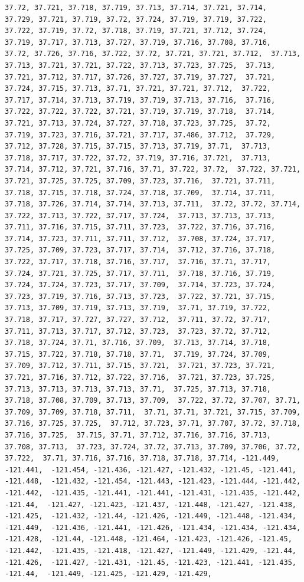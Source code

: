 \documentclass[
]{article}
\begin{document}
\begin{verbatim}
37.72, 37.721, 37.718, 37.719, 37.713, 37.714, 37.721, 37.714,  37.729, 37.721, 37.719, 37.72, 37.724, 37.719, 37.719, 37.722,  37.722, 37.719, 37.72, 37.718, 37.719, 37.721, 37.712, 37.724,  37.719, 37.717, 37.713, 37.727, 37.719, 37.716, 37.708, 37.716,  37.72, 37.726, 37.716, 37.722, 37.72, 37.721, 37.721, 37.712,  37.713, 37.713, 37.721, 37.721, 37.722, 37.713, 37.723, 37.725,  37.713, 37.721, 37.712, 37.717, 37.726, 37.727, 37.719, 37.727,  37.721, 37.724, 37.715, 37.713, 37.71, 37.721, 37.721, 37.712,  37.722, 37.717, 37.714, 37.713, 37.719, 37.719, 37.713, 37.716,  37.716, 37.722, 37.722, 37.722, 37.721, 37.719, 37.719, 37.718,  37.714, 37.721, 37.713, 37.724, 37.727, 37.718, 37.723, 37.725,  37.72, 37.719, 37.723, 37.716, 37.721, 37.717, 37.486, 37.712,  37.729, 37.712, 37.728, 37.715, 37.715, 37.713, 37.719, 37.71,  37.713, 37.718, 37.717, 37.722, 37.72, 37.719, 37.716, 37.721,  37.713, 37.714, 37.712, 37.721, 37.716, 37.71, 37.722, 37.72,  37.722, 37.721, 37.721, 37.725, 37.725, 37.709, 37.723, 37.716,  37.721, 37.711, 37.718, 37.715, 37.718, 37.724, 37.718, 37.709,  37.714, 37.711, 37.718, 37.726, 37.714, 37.714, 37.713, 37.711,  37.72, 37.72, 37.714, 37.722, 37.713, 37.722, 37.717, 37.724,  37.713, 37.713, 37.713, 37.711, 37.716, 37.715, 37.711, 37.723,  37.722, 37.716, 37.716, 37.714, 37.723, 37.711, 37.711, 37.712,  37.708, 37.724, 37.717, 37.725, 37.709, 37.723, 37.717, 37.714,  37.712, 37.716, 37.718, 37.722, 37.717, 37.718, 37.716, 37.717,  37.716, 37.71, 37.717, 37.724, 37.721, 37.725, 37.717, 37.711,  37.718, 37.716, 37.719, 37.724, 37.724, 37.723, 37.717, 37.709,  37.714, 37.723, 37.724, 37.723, 37.719, 37.716, 37.713, 37.723,  37.722, 37.721, 37.715, 37.713, 37.709, 37.719, 37.713, 37.719,  37.71, 37.719, 37.722, 37.718, 37.717, 37.727, 37.727, 37.712,  37.711, 37.72, 37.717, 37.711, 37.713, 37.717, 37.712, 37.723,  37.723, 37.72, 37.712, 37.718, 37.724, 37.71, 37.716, 37.709,  37.713, 37.714, 37.718, 37.715, 37.722, 37.718, 37.718, 37.71,  37.719, 37.724, 37.709, 37.709, 37.712, 37.711, 37.715, 37.721,  37.721, 37.723, 37.721, 37.721, 37.716, 37.712, 37.722, 37.716,  37.721, 37.723, 37.725, 37.713, 37.713, 37.713, 37.713, 37.71,  37.725, 37.713, 37.718, 37.718, 37.708, 37.709, 37.713, 37.709,  37.722, 37.72, 37.707, 37.71, 37.709, 37.709, 37.718, 37.711,  37.71, 37.71, 37.721, 37.715, 37.709, 37.716, 37.725, 37.725,  37.712, 37.723, 37.71, 37.707, 37.72, 37.718, 37.716, 37.725,  37.715, 37.71, 37.712, 37.716, 37.716, 37.713, 37.708, 37.713,  37.723, 37.724, 37.72, 37.713, 37.709, 37.706, 37.72, 37.722,  37.71, 37.716, 37.716, 37.718, 37.718, 37.714, -121.449, -121.441,  -121.454, -121.436, -121.427, -121.432, -121.45, -121.441, -121.448,  -121.432, -121.454, -121.443, -121.423, -121.444, -121.442, -121.442,  -121.435, -121.441, -121.441, -121.431, -121.435, -121.442, -121.44,  -121.427, -121.423, -121.437, -121.448, -121.427, -121.438, -121.425,  -121.432, -121.44, -121.426, -121.449, -121.448, -121.434, -121.449,  -121.436, -121.441, -121.426, -121.434, -121.434, -121.434, -121.428,  -121.44, -121.448, -121.464, -121.423, -121.426, -121.45, -121.442,  -121.435, -121.418, -121.427, -121.449, -121.429, -121.44, -121.426,  -121.427, -121.431, -121.45, -121.423, -121.441, -121.435, -121.44,  -121.449, -121.425, -121.429, -121.429, 
\end{verbatim}
\end{document}
